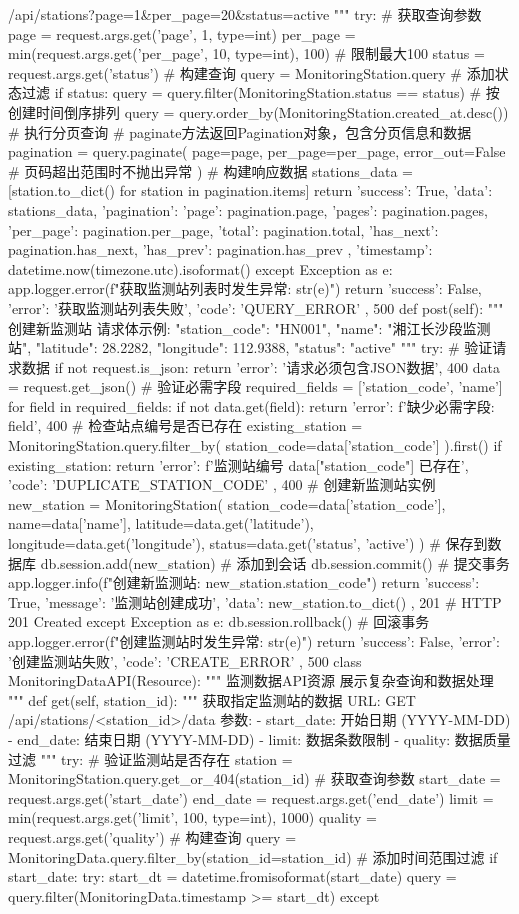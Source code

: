 {{{{{{/api/stations?page=1&per_page=20&status=active """ try: # 获取查询参数 page = request.args.get('page', 1, type=int) per_page = min(request.args.get('per_page', 10, type=int), 100) # 限制最大100 status = request.args.get('status') # 构建查询 query = MonitoringStation.query # 添加状态过滤 if status: query = query.filter(MonitoringStation.status == status) # 按创建时间倒序排列 query = query.order_by(MonitoringStation.created_at.desc()) # 执行分页查询 # paginate方法返回Pagination对象，包含分页信息和数据 pagination = query.paginate( page=page, per_page=per_page, error_out=False # 页码超出范围时不抛出异常 ) # 构建响应数据 stations_data = [station.to_dict() for station in pagination.items] return { 'success': True, 'data': stations_data, 'pagination': { 'page': pagination.page, 'pages': pagination.pages, 'per_page': pagination.per_page, 'total': pagination.total, 'has_next': pagination.has_next, 'has_prev': pagination.has_prev }, 'timestamp': datetime.now(timezone.utc).isoformat() } except Exception as e: app.logger.error(f"获取监测站列表时发生异常: {str(e)}") return { 'success': False, 'error': '获取监测站列表失败', 'code': 'QUERY_ERROR' }, 500 def post(self): """ 创建新监测站 请求体示例: { "station_code": "HN001", "name": "湘江长沙段监测站", "latitude": 28.2282, "longitude": 112.9388, "status": "active" } """ try: # 验证请求数据 if not request.is_json: return {'error': '请求必须包含JSON数据'}, 400 data = request.get_json() # 验证必需字段 required_fields = ['station_code', 'name'] for field in required_fields: if not data.get(field): return {'error': f'缺少必需字段: {field}'}, 400 # 检查站点编号是否已存在 existing_station = MonitoringStation.query.filter_by( station_code=data['station_code'] ).first() if existing_station: return { 'error': f'监测站编号 {data["station_code"]} 已存在', 'code': 'DUPLICATE_STATION_CODE' }, 400 # 创建新监测站实例 new_station = MonitoringStation( station_code=data['station_code'], name=data['name'], latitude=data.get('latitude'), longitude=data.get('longitude'), status=data.get('status', 'active') ) # 保存到数据库 db.session.add(new_station) # 添加到会话 db.session.commit() # 提交事务 app.logger.info(f"创建新监测站: {new_station.station_code}") return { 'success': True, 'message': '监测站创建成功', 'data': new_station.to_dict() }, 201 # HTTP 201 Created except Exception as e: db.session.rollback() # 回滚事务 app.logger.error(f"创建监测站时发生异常: {str(e)}") return { 'success': False, 'error': '创建监测站失败', 'code': 'CREATE_ERROR' }, 500 class MonitoringDataAPI(Resource): """ 监测数据API资源 展示复杂查询和数据处理 """ def get(self, station_id): """ 获取指定监测站的数据 URL: GET /api/stations/<station_id>/data 参数: - start_date: 开始日期 (YYYY-MM-DD) - end_date: 结束日期 (YYYY-MM-DD) - limit: 数据条数限制 - quality: 数据质量过滤 """ try: # 验证监测站是否存在 station = MonitoringStation.query.get_or_404(station_id) # 获取查询参数 start_date = request.args.get('start_date') end_date = request.args.get('end_date') limit = min(request.args.get('limit', 100, type=int), 1000) quality = request.args.get('quality') # 构建查询 query = MonitoringData.query.filter_by(station_id=station_id) # 添加时间范围过滤 if start_date: try: start_dt = datetime.fromisoformat(start_date) query = query.filter(MonitoringData.timestamp >= start_dt) except }}}}}}
